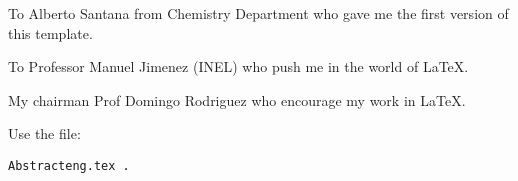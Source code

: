 ﻿%

To Alberto Santana from Chemistry Department who gave me the first version of this template.\par

To Professor Manuel Jimenez (INEL) who push me in the world of \LaTeX.

My chairman Prof Domingo Rodriguez who encourage my work in \LaTeX.

Use the file: 

\begin{verbatim}
Abstracteng.tex .
\end{verbatim}
